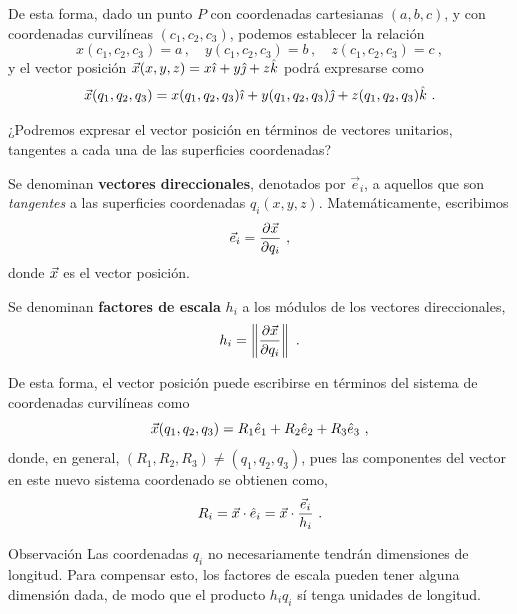 De esta forma, dado un punto $P$ con coordenadas cartesianas $(a,b,c)$, y con coordenadas curvilíneas $(c_1, c_2, c_3)$, podemos establecer la relación 
\begin{equation}
    x(c_1, c_2, c_3) = a \, , \quad y(c_1, c_2, c_3) = b \, , \quad z(c_1, c_2, c_3) = c \ ,
\end{equation} 
y el vector posición $\vec{x}(x,y,z) = x \hat{\imath} + y \hat{\jmath} + z \hat{k}$ podrá expresarse como 
\begin{equation*}
    \vec{x}(q_1, q_2, q_3) = x(q_1, q_2, q_3) \hat{\imath} + y(q_1, q_2, q_3) \hat{\jmath} + z(q_1, q_2, q_3) \hat{k} \ .
\end{equation*}

¿Podremos expresar el vector posición en términos de vectores unitarios, tangentes a cada una de las superficies coordenadas?

\begin{defi}
    Se denominan \textbf{vectores direccionales}, denotados por $\vec{e}_i$, a aquellos que son \emph{tangentes} a las superficies coordenadas $q_i(x,y,z)$. Matemáticamente, escribimos 
    \begin{equation}
        \vec{e}_i = \frac{\partial \vec{x}}{\partial q_i} \ ,
    \end{equation} 
    donde $\vec{x}$ es el vector posición.
\end{defi}

\begin{defi}
    Se denominan \textbf{factores de escala} $h_i$ a los módulos de los vectores direccionales,
    \begin{equation}
        h_i = \left\| \frac{\partial \vec{x}}{\partial q_i} \right\| \ .
    \end{equation}
\end{defi}

De esta forma, el vector posición puede escribirse en términos del sistema de coordenadas curvilíneas como 
\begin{equation}
    \vec{x}(q_1, q_2, q_3) = R_1 \hat{e}_1 + R_2 \hat{e}_2 + R_3 \hat{e}_3 \ ,
\end{equation}
donde, en general, $(R_1, R_2, R_3) \neq (q_1, q_2, q_3)$, pues las componentes del vector en este nuevo sistema coordenado se obtienen como,
\begin{equation*}
    R_i = \vec{x} \cdot \hat{e}_i = \vec{x} \cdot \frac{\vec{e}_i}{h_i} \ .
\end{equation*}

\begin{obs}{Observación}
    Las coordenadas $q_i$ no necesariamente tendrán dimensiones de longitud. Para compensar esto, los factores de escala pueden tener alguna dimensión dada, de modo que el producto $h_i q_i$ sí tenga unidades de longitud.
\end{obs}

